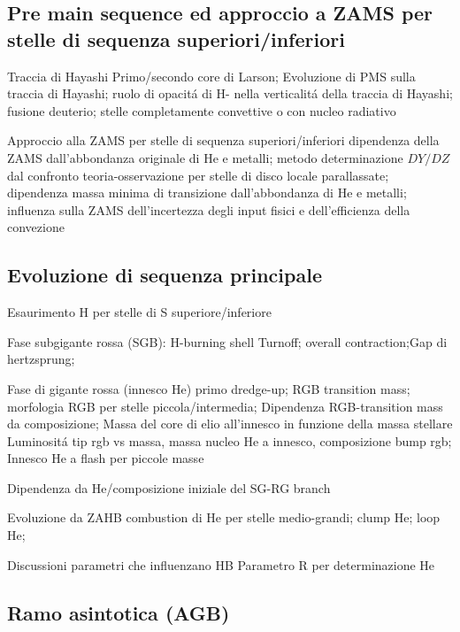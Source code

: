 \subsection{Pre main sequence ed approccio a ZAMS per stelle di sequenza superiori/inferiori}

\begin{frame}{Traccia di Hayashi}
Primo/secondo core di Larson; Evoluzione di PMS sulla traccia di Hayashi; ruolo di opacit\'a di H- nella verticalit\'a della traccia di Hayashi; fusione deuterio; stelle completamente convettive o con nucleo radiativo
\end{frame}

\begin{frame}{Approccio alla ZAMS per stelle di sequenza superiori/inferiori}
dipendenza della ZAMS dall'abbondanza originale di He e metalli; metodo determinazione $DY/DZ$ dal confronto teoria-osservazione per stelle di disco locale parallassate; dipendenza massa minima di transizione dall'abbondanza di He e metalli; influenza sulla ZAMS dell'incertezza degli input fisici e dell'efficienza della convezione
\end{frame}

\subsection{Evoluzione di sequenza principale}

\begin{frame}{Esaurimento H per stelle di S superiore/inferiore}

\end{frame}

\begin{frame}{Fase subgigante rossa (SGB): H-burning shell}
Turnoff; overall contraction;Gap di hertzsprung;
\end{frame}

\begin{frame}{Fase di gigante rossa (innesco He)}
primo dredge-up; RGB transition mass; morfologia RGB per stelle piccola/intermedia;
Dipendenza RGB-transition mass da composizione;
Massa del core di elio all'innesco in funzione della massa stellare
Luminosit\'a tip rgb vs massa, massa nucleo He a innesco, composizione
bump rgb;
Innesco He a flash per piccole masse
\end{frame}

\begin{frame}{Dipendenza da He/composizione iniziale del SG-RG branch}

\end{frame}

\begin{frame}{Evoluzione da ZAHB}
combustion di He per stelle medio-grandi; clump He; loop He;
\end{frame}

\begin{frame}{Discussioni parametri che influenzano HB}
Parametro R per determinazione He
\end{frame}

\subsection{Ramo asintotica (AGB)}

